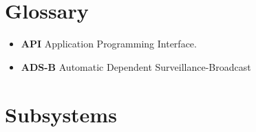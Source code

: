 \documentclass[letterpaper, 11pt]{article}
\begin{document}
\clearpage
\section{Glossary} %
\begin{itemize}
    \item \textbf{API} Application Programming Interface.
    \item \textbf{ADS-B} Automatic Dependent Surveillance-Broadcast
\end{itemize}




\section{Subsystems}







\end{document}
